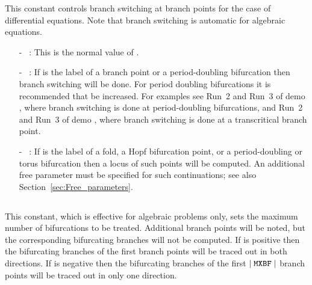  This constant controls branch switching at branch points for the case
 of differential equations.
 Note that branch switching is automatic for algebraic equations.
\begin{itemize}
\item[-] ~: This is the normal value of .
\item[-] ~:
  If  is the label of a branch point or a period-doubling
  bifurcation then branch switching will be done.
  For period doubling bifurcations it is recommended that  be increased.
  For examples see Run~2 and Run~3 of demo , where branch switching
  is done at period-doubling bifurcations, and Run~2 and Run~3 of demo ,
  where branch switching is done at a transcritical branch point.
\item[-] ~:
  If  is the label of a fold, a Hopf bifurcation point, 
  or a period-doubling or torus bifurcation then a locus of such points will be
  computed. An additional free parameter must be specified for such 
  continuations; 
  see also Section~\ref{sec:Free_parameters}.
\end{itemize}

\subsection{}  \label{sec:MXBF}


 This constant, which is effective for algebraic problems only,
 sets the maximum number of bifurcations to be treated.
 Additional branch points will be noted, but the corresponding bifurcating
 branches will not be computed.
 If  is positive then the bifurcating branches of the first 
  branch points will be traced out in both directions.
 If  is negative then the bifurcating branches of the first 
 $\mid{\tt  MXBF}\mid$ branch points will be traced out in only one direction. 

